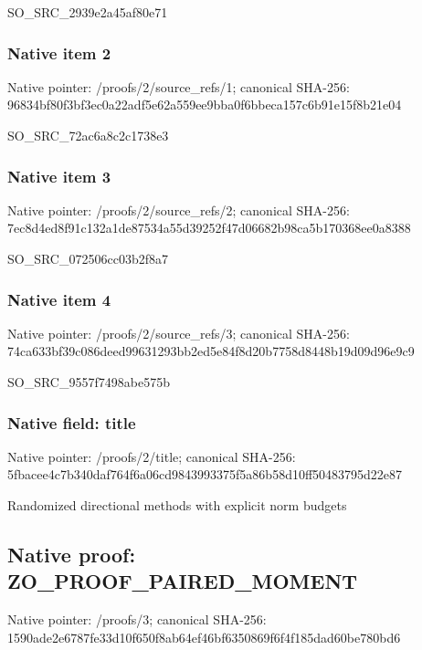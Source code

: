 \documentclass[10pt,a4paper]{article}
\begin{document}
SO\_SRC\_2939e2a45af80e71


\subsubsection{Native item 2}


Native pointer: /proofs/2/source\_refs/1; canonical SHA-256: 96834bf80f3bf3ec0a22adf5\allowbreak{}e62a559ee9bba0f6bbeca157\allowbreak{}c6b91e15f8b21e04


SO\_SRC\_72ac6a8c2c1738e3


\subsubsection{Native item 3}


Native pointer: /proofs/2/source\_refs/2; canonical SHA-256: 7ec8d4ed8f91c132a1de8753\allowbreak{}4a55d39252f47d06682b98ca\allowbreak{}5b170368ee0a8388


SO\_SRC\_072506cc03b2f8a7


\subsubsection{Native item 4}


Native pointer: /proofs/2/source\_refs/3; canonical SHA-256: 74ca633bf39c086deed99631\allowbreak{}293bb2ed5e84f8d20b7758d8\allowbreak{}448b19d09d96e9c9


SO\_SRC\_9557f7498abe575b


\subsubsection{Native field: title}


Native pointer: /proofs/2/title; canonical SHA-256: 5fbacee4c7b340daf764f6a0\allowbreak{}6cd9843993375f5a86b58d10\allowbreak{}ff50483795d22e87


Randomized directional methods with explicit norm budgets


\subsection{Native proof: ZO\_PROOF\_PAIRED\_MOMENT}


Native pointer: /proofs/3; canonical SHA-256: 1590ade2e6787fe33d10f650\allowbreak{}f8ab64ef46bf6350869f6f4f\allowbreak{}185dad60be780bd6
\end{document}
